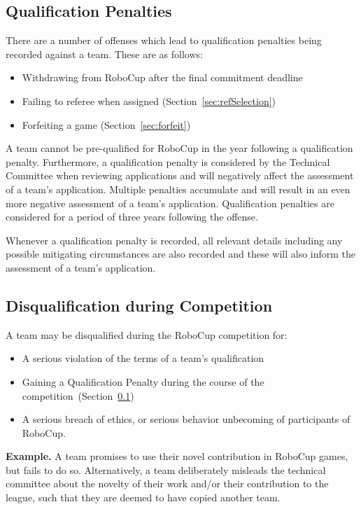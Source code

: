 \subsection{Qualification Penalties}
\label{sec:qualificationPenalties}

There are a number of offenses which lead to qualification penalties being recorded against a team. These are as follows:
\begin{itemize}
    \item Withdrawing from RoboCup after the final commitment deadline
    \item Failing to referee when assigned (Section~\ref{sec:refSelection})
    \item Forfeiting a game (Section~\ref{sec:forfeit})
\end{itemize}

A team cannot be pre-qualified for RoboCup in the year following a qualification penalty. Furthermore, a qualification penalty is considered by the Technical Committee when reviewing applications and will negatively affect the assessment of a team's application. Multiple penalties accumulate and will result in an even more negative assessment of a team's application. Qualification penalties are considered for a period of three years following the offense.

Whenever a qualification penalty is recorded, all relevant details including any possible mitigating circumstances are also recorded and these will also inform the assessment of a team's application.

\subsection{Disqualification during Competition}
\label{sec:disqualification_during_comp}

A team may be disqualified during the RoboCup competition for:
\begin{itemize}
  \item A serious violation of the terms of a team's qualification
  \item Gaining a Qualification Penalty during the course of the competition~(\cf Section~\ref{sec:qualificationPenalties})
  \item A serious breach of ethics, or serious behavior unbecoming of participants of RoboCup.
\end{itemize}

\textbf{Example.} A team promises to use their novel contribution in RoboCup games, but fails to do so.
Alternatively, a team deliberately misleads the technical committee about the novelty of their work and/or their contribution to the league, such that they are deemed to have copied another team.

